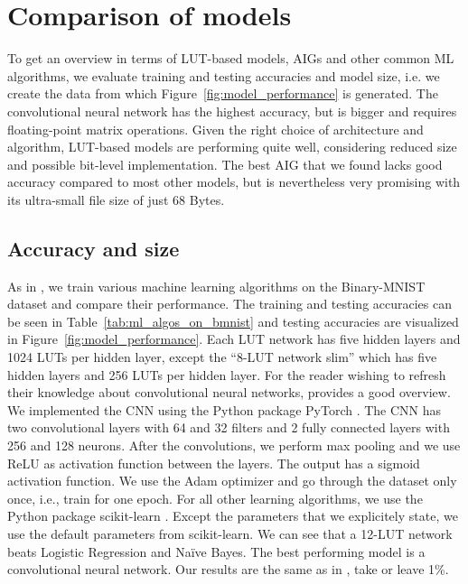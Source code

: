 \section{Comparison of models}
To get an overview in terms of LUT-based models, AIGs and other common ML algorithms, we evaluate training and testing accuracies and model size, i.e. we create the data from which Figure~\ref{fig:model_performance} is generated. The convolutional neural network has the highest accuracy, but is bigger and requires floating-point matrix operations. Given the right choice of architecture and algorithm, LUT-based models are performing quite well, considering reduced size and possible bit-level implementation. The best AIG that we found lacks good accuracy compared to most other models, but is nevertheless very promising with its ultra-small file size of just 68 Bytes.

\subsection{Accuracy and size} \label{sec:models}
As in \cite{bib:chatterjee2018learning}, we train various machine learning algorithms on the Binary-MNIST dataset and compare their performance. The training and testing accuracies can be seen in Table~\ref{tab:ml_algos_on_bmnist} and testing accuracies are visualized in Figure~\ref{fig:model_performance}. Each LUT network has five hidden layers and 1024 LUTs per hidden layer, except the \enquote{8-LUT network slim} which has five hidden layers and 256 LUTs per hidden layer. For the reader wishing to refresh their knowledge about convolutional neural networks, \cite{bib:yamashita2018convolutional} provides a good overview. We implemented the CNN using the Python package PyTorch \cite{bib:NEURIPS2019-9015}. The CNN has two convolutional layers with 64 and 32 filters and 2 fully connected layers with 256 and 128 neurons. After the convolutions, we perform max pooling and we use ReLU as activation function between the layers. The output has a sigmoid activation function. We use the Adam optimizer and go through the dataset only once, i.e., train for one epoch. For all other learning algorithms, we use the Python package scikit-learn \cite{bib:scikit-learn}. Except the parameters that we explicitely state, we use the default parameters from scikit-learn. We can see that a 12-LUT network beats Logistic Regression and Naïve Bayes. The best performing model is a convolutional neural network. Our results are the same as in \cite{bib:chatterjee2018learning}, take or leave 1\%.

